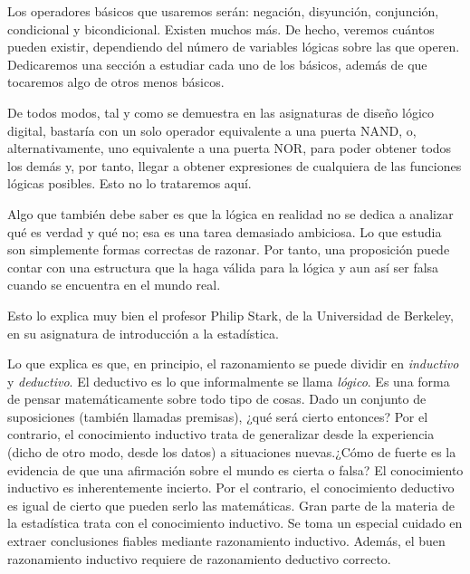
Los operadores básicos que usaremos serán: negación, disyunción, conjunción,
condicional y bicondicional. Existen muchos más. De hecho, veremos cuántos
pueden existir, dependiendo del número de variables lógicas sobre las que
operen. Dedicaremos una sección a estudiar cada uno de los básicos, además
de que tocaremos algo de otros menos básicos.

De todos modos, tal y como se demuestra en las asignaturas de diseño lógico
digital, bastaría con un solo operador equivalente a una puerta NAND, o,
alternativamente, uno equivalente a una puerta NOR, para poder obtener todos
los demás y, por tanto, llegar a obtener expresiones de cualquiera de las
funciones lógicas posibles. Esto no lo trataremos aquí.

Algo que también debe saber es que la lógica en realidad no se dedica a
analizar qué es verdad y qué no; esa es una tarea demasiado ambiciosa. Lo
que estudia son simplemente formas correctas de razonar. Por tanto, una
proposición puede contar con una estructura que la haga válida para la
lógica y aun así ser falsa cuando se encuentra en el mundo real.

Esto lo explica muy bien el profesor Philip Stark, de la Universidad de
Berkeley, en su asignatura de introducción a la estadística.

Lo que explica es que, en principio, el razonamiento se puede dividir en
\emph{inductivo} y \emph{deductivo}. El deductivo es lo que informalmente se
llama \emph{lógico}. Es una forma de pensar matemáticamente sobre todo tipo
de cosas. Dado un conjunto de suposiciones (también llamadas premisas), ¿qué
será cierto entonces? Por el contrario, el conocimiento inductivo trata de
generalizar desde la experiencia (dicho de otro modo, desde los datos) a
situaciones nuevas.\footnotemark ¿Cómo de fuerte es la evidencia de que una
afirmación sobre el mundo es cierta o falsa? El conocimiento inductivo es
inherentemente incierto. Por el contrario, el conocimiento deductivo es
igual de cierto que pueden serlo las matemáticas. Gran parte de la materia
de la estadística trata con el conocimiento inductivo. Se toma un especial
cuidado en extraer conclusiones fiables mediante razonamiento inductivo.
Además, el buen razonamiento inductivo requiere de razonamiento deductivo
correcto.



